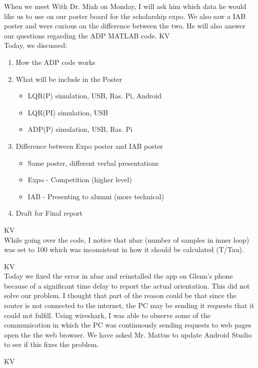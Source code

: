 \documentclass[fontsize=11pt, %
                             paper=letter, %
                             openany, %
                             captions=tableheading,
                             index=totoc,
                             hyperref]{labbook}
\begin{document}
\begin{addmargin}[0cm]{0cm}
When we meet With Dr. Miah on Monday, I will ask him which data he would like us to use on our poster board for the scholarship expo.  We also saw a IAB poster and were curious on the difference between the two.  He will also answer our questions regarding the ADP MATLAB code.
KV\\
Today, we discussed:
\begin{enumerate}
    \item How the ADP code works
    \item What will be include in the Poster
    \begin{itemize}
        \item LQR(P) simulation, USB, Ras. Pi, Android
        \item LQR(PI) simulation, USB
        \item ADP(P) simulation, USB, Ras. Pi
    \end{itemize}
    \item Difference between Expo poster and IAB poster
    \begin{itemize}
        \item Same poster, different verbal presentations
        \item Expo - Competition (higher level)
        \item IAB - Presenting to alumni (more technical)
    \end{itemize}
    \item Draft for Final report
\end{enumerate}

KV\\
While going over the code, I notice that nbar (number of samples in inner loop) was set to 100 which was inconsistent in how it should be calculated (T/Tau).

KV\\
Today we fixed the error in nbar and reinstalled the app on Glenn's phone because of a significant time delay to report the actual orientation.  This did not solve our problem.  I thought that part of the reason could be that since the router is not connected to the internet, the PC may be sending it requests that it could not fulfill.  Using wireshark, I was able to observe some of the communication in which the PC was continuously sending requests to web pages open the the web browser.  We have asked Mr. Mattus to update Android Studio to see if this fixes the problem.

KV\\



\end{addmargin}
\end{document}

